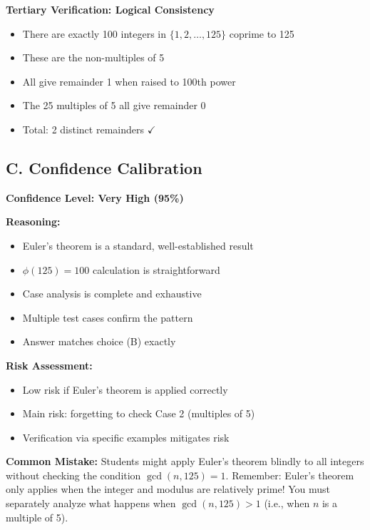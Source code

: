 \documentclass[12pt]{article}
\begin{document}
\begin{verificationbox}
\textbf{Tertiary Verification: Logical Consistency}
\begin{itemize}
    \item There are exactly 100 integers in $\{1, 2, \ldots, 125\}$ coprime to 125
    \item These are the non-multiples of 5
    \item All give remainder 1 when raised to 100th power
    \item The 25 multiples of 5 all give remainder 0
    \item Total: 2 distinct remainders $\checkmark$
\end{itemize}

\subsection*{C. Confidence Calibration}

\textbf{Confidence Level: Very High (95\%)}

\textbf{Reasoning:}
\begin{itemize}
    \item Euler's theorem is a standard, well-established result
    \item $\phi(125) = 100$ calculation is straightforward
    \item Case analysis is complete and exhaustive
    \item Multiple test cases confirm the pattern
    \item Answer matches choice (B) exactly
\end{itemize}

\textbf{Risk Assessment:}
\begin{itemize}
    \item Low risk if Euler's theorem is applied correctly
    \item Main risk: forgetting to check Case 2 (multiples of 5)
    \item Verification via specific examples mitigates risk
\end{itemize}
\end{verificationbox}

\vspace{1em}

\begin{warningbox}
\textbf{Common Mistake:} Students might apply Euler's theorem blindly to all integers without checking the condition $\gcd(n, 125) = 1$. Remember: Euler's theorem only applies when the integer and modulus are relatively prime! You must separately analyze what happens when $\gcd(n, 125) > 1$ (i.e., when $n$ is a multiple of 5).
\end{warningbox}
\end{document}
